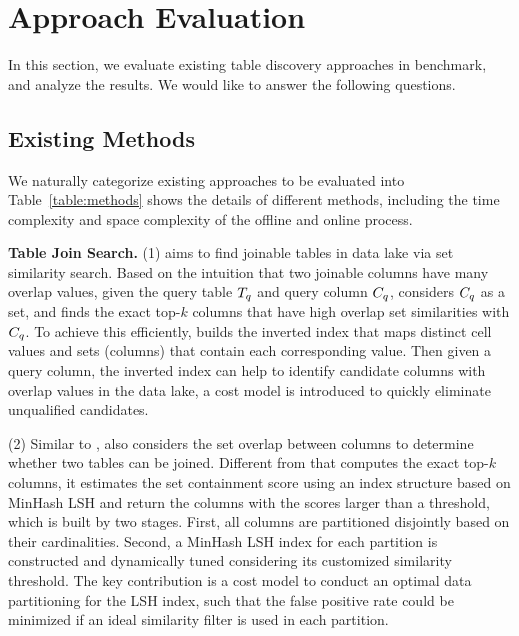 \section{Approach Evaluation} 
In this section, we evaluate existing table discovery approaches in \sys benchmark, and analyze the results.
We would like to answer the following questions. 


\subsection{Existing Methods}
We naturally categorize existing approaches to be evaluated into  Table~\ref{table:methods} shows the details of different methods, including the time complexity and space complexity of the offline and online process. 



\noindent\textbf{Table Join Search.} (1) \josie aims to find joinable tables in data lake via set similarity search. Based on the intuition that two joinable columns have many overlap values, given the query table $T_q$ and query column $C_q$,  \josie considers $C_q$ as a set, and finds the  exact top-$k$ columns  that have high overlap set similarities with $C_q$. %
 To achieve this efficiently, \josie builds the inverted index that maps distinct cell values and sets (columns) that contain each corresponding value. Then given a query column, the inverted index can help to identify candidate columns with overlap values in the data lake, a cost model is introduced to quickly eliminate unqualified candidates.  
 
 \noindent  (2) Similar to \josie, \lsh also considers the set overlap between columns to determine whether two tables can be joined.  Different from \josie that computes the exact top-$k$ columns, it estimates the set containment score using an index structure based on MinHash LSH and return the columns with the scores larger than a threshold, which is  built by two stages. First, all columns are partitioned disjointly based on their cardinalities. Second, a MinHash LSH index for each partition is constructed and dynamically tuned considering its customized  similarity threshold. The key contribution is a cost model to conduct an optimal data partitioning for the LSH index, such that the false positive rate could be minimized if an ideal  similarity filter is used in each partition. 
 
